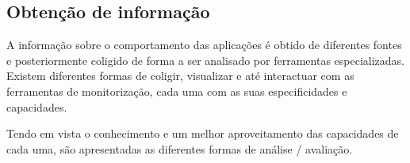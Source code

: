 
\subsection{Obtenção de informação}\label{sect:instrumentation_overview}
% 
% 
% 
% 
% 
% 
% 

A informação sobre o comportamento das aplicações é obtido de diferentes fontes e posteriormente coligido de forma a ser analisado por ferramentas especializadas. Existem diferentes formas de coligir, visualizar e até interactuar com as ferramentas de monitorização, cada uma com as suas especificidades e capacidades.

Tendo em vista o conhecimento e um melhor aproveitamento das capacidades de cada uma, são apresentadas as diferentes formas de análise / avaliação.


